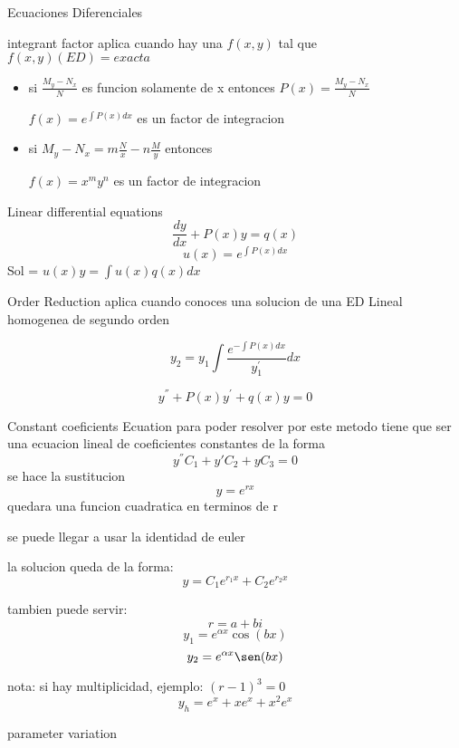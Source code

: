 \begin{section}{Ecuaciones Diferenciales}
	\begin{subsection}{integrant factor}
	aplica cuando hay una $f(x,y) $ tal que $f(x,y)(ED) = exacta$
	
	\begin{itemize}
		\item si $ \frac{M_y - N_x}{N}$ es funcion solamente de x entonces $P(x) = \frac{M_y - N_x}{N}$
			\begin{center}
		$f(x) = e^{\int P(x)dx}$ es un factor de integracion
			\end{center}
	
		\item si $M_y - N_x = m\frac{N}{x} - n\frac{M}{y}$ entonces
			\begin{center}
				$f(x) = x^my^n$ es un factor de integracion
			\end{center}
	
	\end{itemize}
	
	\end{subsection}
	\begin{subsection}{Linear differential equations}
		$$\frac{dy}{dx} + P(x)y = q(x) $$
		$$u(x) = e^{\int P(x) dx }$$
		Sol =  $u(x)y = \int u(x)q(x)dx$
	
	\end{subsection}
	\begin{subsection}{Order Reduction}
		aplica cuando conoces una solucion de una ED Lineal homogenea de segundo orden
		
		$$y_2 = y_1 \int \frac{e^{- \int P(x) dx }}{y_1^{'}} dx $$
		
		$$y^{''} + P(x)y^{'} + q(x)y = 0$$
	\end{subsection}
	\begin{subsection}{Constant coeficients Ecuation}
		para poder resolver por este metodo tiene que ser una ecuacion lineal de coeficientes constantes
		de la forma $$y^{''}C_1 + y{'}C_2 + yC_3 = 0$$
		se hace la sustitucion $$y=e^{rx}$$ quedara una funcion cuadratica en terminos de r
		
		se puede llegar a usar la identidad de euler
		
		la solucion queda de la forma:
		$$y=C_1e^{r_1x} + C_2e^{r_2x}$$
		
		tambien puede servir:
		$$r = a + bi $$
		$$ y_1 = e^{ \alpha x } \cos (bx)$$
		$$ y_2 = e^{ \alpha x } \sen (bx) $$
		
		
		nota:
		si hay multiplicidad, ejemplo: $(r-1)^3 = 0 $
		$$y_h = e^x + xe^x + x^2e^x$$	
	\end{subsection}
	\begin{subsection}{parameter variation}
		

\end{subsection}
\end{section}
